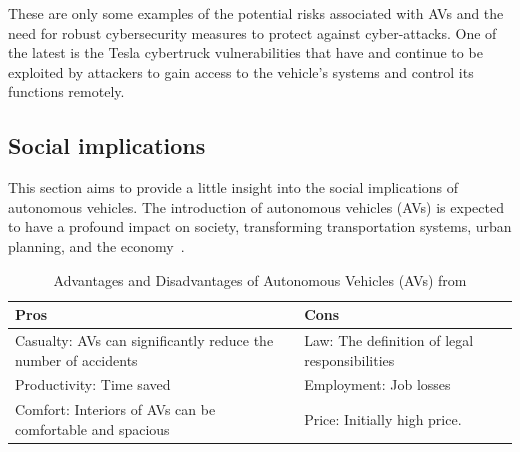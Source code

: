 These are only some examples of the potential risks associated with AVs and the need for robust cybersecurity measures to protect against cyber-attacks.
One of the latest is the Tesla cybertruck vulnerabilities that have and continue to be exploited by attackers to gain access to the vehicle's systems and control its functions remotely.

\subsection{Social implications}\label{subsec:social-implications}

This section aims to provide a little insight into the social implications of autonomous vehicles.
The introduction of autonomous vehicles (AVs) is expected to have a profound impact on society\cite{thomas2020perception},
transforming transportation systems\cite{intelligent_transportation_2023}, urban planning\cite{impact_autonomous_vehicles_2018},
and the economy~\cite{economic_aspects_2020}.

\begin{table}[ht]
    \centering
    \begin{tabular}{|l|l|}
        \hline
        \textbf{Pros} & \textbf{Cons} \\ \hline
        Casualty: AVs can significantly reduce the number of accidents & Law: The definition of legal responsibilities \\ \hline
        Productivity: Time saved & Employment: Job losses \\ \hline
        Comfort: Interiors of AVs can be comfortable and spacious & Price: Initially high price. \\ \hline
    \end{tabular}
    \caption{Advantages and Disadvantages of Autonomous Vehicles (AVs) from \cite{ahangar2021survey} }\label{tab:table}
\end{table}
